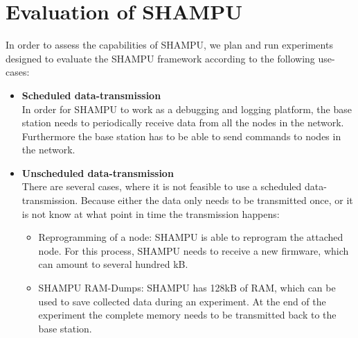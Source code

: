 
\chapter{Evaluation of SHAMPU}
In order to assess the capabilities of SHAMPU, we plan and run experiments designed to evaluate the SHAMPU framework according to the following use-cases:
\begin{itemize}
	\item{\textbf{Scheduled data-transmission}} \hfill \\ In order for SHAMPU to work as a debugging and logging platform, the base station needs to periodically receive data from all the nodes in the network. Furthermore the base station has to be able to send commands to nodes in the network.
	\item{\textbf{Unscheduled data-transmission}} \hfill \\ There are several cases, where it is not feasible to use a scheduled data-transmission. Because either the data only needs to be transmitted once, or it is not know at what point in time the transmission happens: 
	\begin{itemize}
		\item{}Reprogramming of a node: SHAMPU is able to reprogram the attached node. For this process, SHAMPU needs to receive a new firmware, which can amount to several hundred kB.
		\item{}SHAMPU RAM-Dumps: SHAMPU has 128kB of RAM, which can be used to save collected data during an experiment. At the end of the experiment the complete memory needs to be transmitted back to the base station.
	\end{itemize}
\end{itemize}
	
